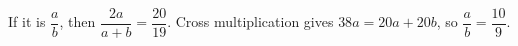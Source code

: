 If it is $\dfrac{a}{b}$, then $\dfrac{2a}{a+b}=\dfrac{20}{19}$. Cross multiplication gives $38a=20a+20b$, so $\boxed{\dfrac{a}{b}=\dfrac{10}{9}}$.
